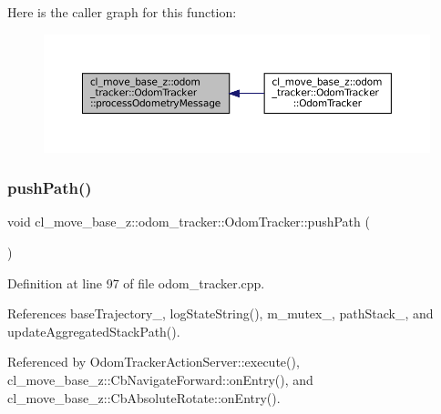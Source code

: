 Here is the caller graph for this function\+:
\nopagebreak
\begin{figure}[H]
\begin{center}
\leavevmode
\includegraphics[width=350pt]{classcl__move__base__z_1_1odom__tracker_1_1OdomTracker_a12c5a839cfde2e8f2f55a5e0c9647b18_icgraph}
\end{center}
\end{figure}
\mbox{\label{classcl__move__base__z_1_1odom__tracker_1_1OdomTracker_a205ee48ec8b4599658e7408fc4755239}} 
\subsubsection{\texorpdfstring{push\+Path()}{pushPath()}}
{\footnotesize\ttfamily void cl\+\_\+move\+\_\+base\+\_\+z\+::odom\+\_\+tracker\+::\+Odom\+Tracker\+::push\+Path (\begin{DoxyParamCaption}{ }\end{DoxyParamCaption})}



Definition at line 97 of file odom\+\_\+tracker.\+cpp.



References base\+Trajectory\+\_\+, log\+State\+String(), m\+\_\+mutex\+\_\+, path\+Stack\+\_\+, and update\+Aggregated\+Stack\+Path().



Referenced by Odom\+Tracker\+Action\+Server\+::execute(), cl\+\_\+move\+\_\+base\+\_\+z\+::\+Cb\+Navigate\+Forward\+::on\+Entry(), and cl\+\_\+move\+\_\+base\+\_\+z\+::\+Cb\+Absolute\+Rotate\+::on\+Entry().


